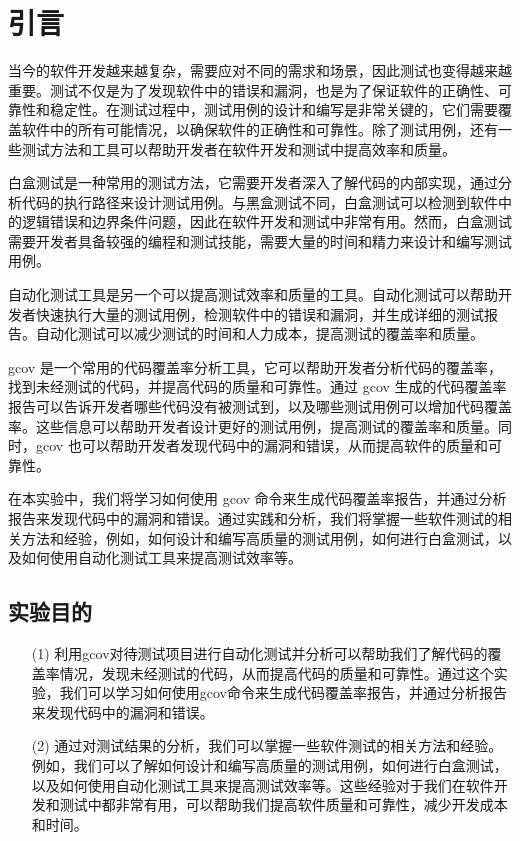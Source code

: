 \documentclass[12pt, a4paper, oneside,bibend=bibtex]{ctexart}
\begin{document}
\section{引言}
当今的软件开发越来越复杂，需要应对不同的需求和场景，因此测试也变得越来越重要\cite{khan2014importance}。测试不仅是为了发现软件中的错误和漏洞，也是为了保证软件的正确性、可靠性和稳定性。在测试过程中，测试用例的设计和编写是非常关键的，它们需要覆盖软件中的所有可能情况，以确保软件的正确性和可靠性。除了测试用例，还有一些测试方法和工具可以帮助开发者在软件开发和测试中提高效率和质量。

白盒测试是一种常用的测试方法，它需要开发者深入了解代码的内部实现，通过分析代码的执行路径来设计测试用例。与黑盒测试不同，白盒测试可以检测到软件中的逻辑错误和边界条件问题，因此在软件开发和测试中非常有用\cite{bertolino2007software}。然而，白盒测试需要开发者具备较强的编程和测试技能，需要大量的时间和精力来设计和编写测试用例。

自动化测试工具是另一个可以提高测试效率和质量的工具。自动化测试可以帮助开发者快速执行大量的测试用例，检测软件中的错误和漏洞，并生成详细的测试报告。自动化测试可以减少测试的时间和人力成本，提高测试的覆盖率和质量\cite{myers2011art}。

gcov 是一个常用的代码覆盖率分析工具，它可以帮助开发者分析代码的覆盖率，找到未经测试的代码，并提高代码的质量和可靠性。通过 gcov 生成的代码覆盖率报告可以告诉开发者哪些代码没有被测试到，以及哪些测试用例可以增加代码覆盖率。这些信息可以帮助开发者设计更好的测试用例，提高测试的覆盖率和质量。同时，gcov 也可以帮助开发者发现代码中的漏洞和错误，从而提高软件的质量和可靠性\cite{pezze2008software}。

在本实验中，我们将学习如何使用 gcov 命令来生成代码覆盖率报告，并通过分析报告来发现代码中的漏洞和错误。通过实践和分析，我们将掌握一些软件测试的相关方法和经验，例如，如何设计和编写高质量的测试用例，如何进行白盒测试，以及如何使用自动化测试工具来提高测试效率等。

\subsection{实验目的}
\begin{enumerate}
    \item[(1)] 利用gcov对待测试项目进行自动化测试并分析可以帮助我们了解代码的覆盖率情况，发现未经测试的代码，从而提高代码的质量和可靠性。通过这个实验，我们可以学习如何使用gcov命令来生成代码覆盖率报告，并通过分析报告来发现代码中的漏洞和错误。
    
    \item[(2)] 通过对测试结果的分析，我们可以掌握一些软件测试的相关方法和经验。例如，我们可以了解如何设计和编写高质量的测试用例，如何进行白盒测试，以及如何使用自动化测试工具来提高测试效率等。这些经验对于我们在软件开发和测试中都非常有用，可以帮助我们提高软件质量和可靠性，减少开发成本和时间。
\end{enumerate}
\end{document}
